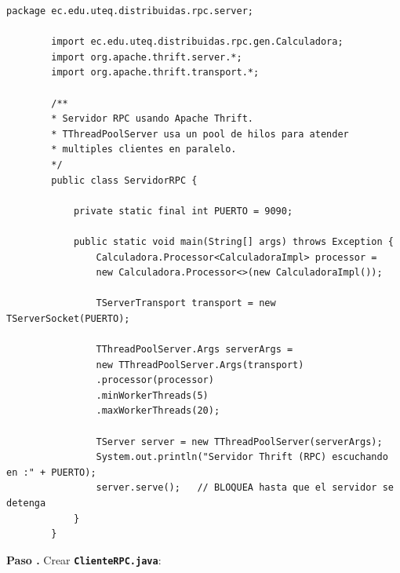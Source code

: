 \documentclass[12pt, a4paper, openany]{book}
\newcounter{paso}[section]
\newcommand{\paso}[1]{%
	\stepcounter{paso}%
	\medskip\noindent
	\begin{tcolorbox}[enhanced, colback=white, colframe=practiceBlue,
		boxrule=0.8pt, arc=3pt, left=6pt, right=6pt, top=4pt, bottom=4pt,
		before upper={\noindent}]
		\textcolor{practiceBlue}{\textbf{Paso \arabic{paso}.}} #1
	\end{tcolorbox}%
}
\newcommand{\archivo}[1]{\texttt{\textbf{#1}}}
\begin{document}
	\begin{lstlisting}[style=JavaStyle, caption={ServidorRPC.java --- Servidor multihilo Thrift}]
		package ec.edu.uteq.distribuidas.rpc.server;
		
		import ec.edu.uteq.distribuidas.rpc.gen.Calculadora;
		import org.apache.thrift.server.*;
		import org.apache.thrift.transport.*;
		
		/**
		* Servidor RPC usando Apache Thrift.
		* TThreadPoolServer usa un pool de hilos para atender
		* multiples clientes en paralelo.
		*/
		public class ServidorRPC {
			
			private static final int PUERTO = 9090;
			
			public static void main(String[] args) throws Exception {
				Calculadora.Processor<CalculadoraImpl> processor =
				new Calculadora.Processor<>(new CalculadoraImpl());
				
				TServerTransport transport = new TServerSocket(PUERTO);
				
				TThreadPoolServer.Args serverArgs =
				new TThreadPoolServer.Args(transport)
				.processor(processor)
				.minWorkerThreads(5)
				.maxWorkerThreads(20);
				
				TServer server = new TThreadPoolServer(serverArgs);
				System.out.println("Servidor Thrift (RPC) escuchando en :" + PUERTO);
				server.serve();   // BLOQUEA hasta que el servidor se detenga
			}
		}
	\end{lstlisting}
	
	\paso{Crear \archivo{ClienteRPC.java}:}
	
\end{document}
